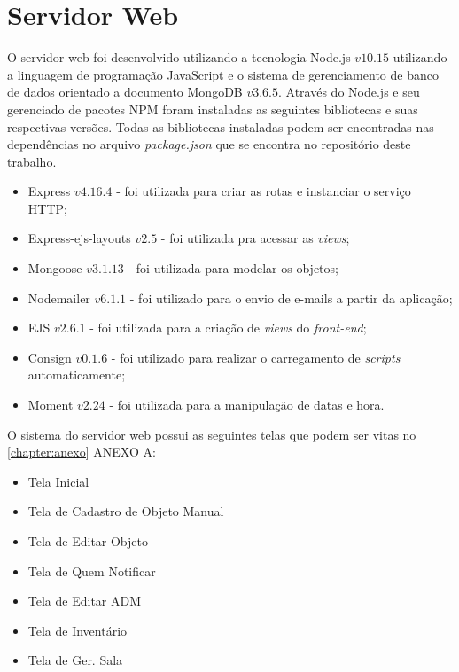 \section{Servidor Web}

O servidor web foi desenvolvido utilizando a tecnologia Node.js $v10.15$ utilizando a linguagem de programação JavaScript e o sistema de gerenciamento de banco de dados orientado a documento MongoDB $v3.6.5$. Através do Node.js e seu gerenciado de pacotes NPM foram instaladas as seguintes bibliotecas e suas respectivas versões. Todas as bibliotecas instaladas podem ser encontradas nas dependências no arquivo \textit{package.json} que se encontra no repositório deste trabalho. 

\begin{itemize}
    \item Express $v4.16.4$ - foi utilizada para criar as rotas e instanciar o serviço HTTP;
    \item Express-ejs-layouts $v2.5$ - foi utilizada pra acessar as \textit{views}; 
    \item Mongoose $v3.1.13$ - foi utilizada para modelar os objetos;
    \item Nodemailer $v6.1.1$ - foi utilizado para o envio de e-mails a partir da aplicação;
    \item EJS $v2.6.1$ - foi utilizada para a criação de \textit{views} do \textit{front-end};
    \item Consign $v0.1.6$ - foi utilizado para realizar o carregamento de \textit{scripts} automaticamente;
    \item Moment $v2.24$ - foi utilizada para a manipulação de datas e hora.
\end{itemize}





\par 
O sistema do servidor web possui as seguintes telas que podem ser vitas no \autoref{chapter:anexo} ANEXO A:%
\begin{itemize}
    \item Tela Inicial
    \item Tela de Cadastro de Objeto Manual
    \item Tela de Editar Objeto
    \item Tela de Quem Notificar
    \item Tela de Editar ADM
    \item Tela de Inventário
    \item Tela de Ger. Sala
\end{itemize}    

